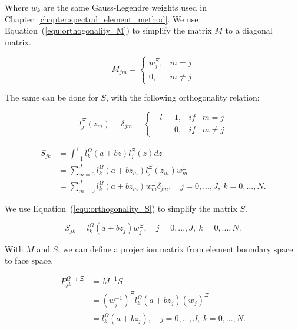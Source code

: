 Where $w_k$ are the same Gauss-Legendre weights used in
Chapter~\ref{chapter:spectral_element_method}. We use Equation~(\ref{equ:orthogonality_M}) to simplify
the matrix $M$ to a diagonal matrix.

\begin{equation}
	M_{jm} = \left\{ \begin{matrix}
	w_j^{\Xi }, &  m = j \\ 
	0, & m \neq  j
	\end{matrix}\right.
\end{equation}

The same can be done for $S$, with the following orthogonality relation:

\begin{equation} \label{equ:orthogonality_S}
	l_j ^ \Xi (z_m) = \delta_{jm} = \left\{ \begin{matrix*}[l]
	& 1, & if & m = j\\ 
	& 0, & if & m \neq j
	\end{matrix*}\right.
\end{equation}

\begin{equation} \label{equ:matrix_S}
	\begin{aligned}
		S_{jk} &= \int_{-1}^{1} l_k ^ \Omega (a + b z) l_j ^ \Xi (z)dz \\
		&= \sum_{m = 0}^{J} l_k ^ \Omega (a + b z_m) l_j ^ \Xi (z_m) w_m ^ \Xi \\
		&= \sum_{m = 0}^{J} l_k ^ \Omega (a + b z_m) w_m ^{\Xi} \delta_{jm}, \quad j = 0, ..., J, \: k = 0, ..., N.
	\end{aligned}
\end{equation}

We use Equation~(\ref{equ:orthogonality_S}) to simplify the matrix $S$.

\begin{equation}
	S_{jk} = l_k^{\Omega } \left( a + bz_j \right)w_j^{\Xi}, \quad j = 0, ..., J, \: k = 0, ..., N.
\end{equation}

With $M$ and $S$, we can define a projection matrix from element boundary space to face space.

\begin{equation}
	\begin{aligned}
		P_{jk} ^ {\Omega  \rightarrow \Xi} &= M^{-1}S \\
		&= (w_j ^{-1})^{\Xi }  l_k ^ \Omega (a + b z_j)(w_j)^{\Xi} \\
		&= l_k ^ \Omega (a + b z_j), \quad j = 0, ..., J, \: k = 0, ..., N.
	\end{aligned}
\end{equation}

